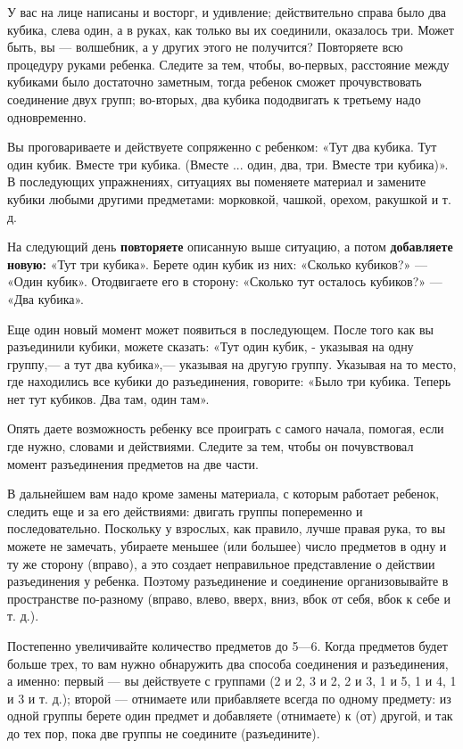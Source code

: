\documentclass[a5paper]{book}
\begin{document}
У вас на лице написаны и восторг, и удивление; действительно справа было
два кубика, слева один, а в руках, как только вы их соединили, оказалось
три. Может быть, вы --- волшебник, а у других этого не получится?
Повторяете всю процедуру руками ребенка. Следите за тем, чтобы,
во-первых, расстояние между кубиками было достаточно заметным, тогда
ребенок сможет прочувствовать соединение двух групп; во-вторых, два
кубика пододвигать к третьему надо одновременно.

Вы проговариваете и действуете сопряженно с ребенком: «Тут два кубика.
Тут один кубик. Вместе три кубика. (Вместе ... один, два, три. Вместе
три кубика)». В последующих упражнениях, ситуациях вы поменяете материал
и замените кубики любыми другими предметами: морковкой, чашкой, орехом,
ракушкой и т. д.

На следующий день \textbf{повторяете} описанную выше ситуацию, а потом
\textbf{добавляете новую:} «Тут три кубика». Берете один кубик из них:
«Сколько кубиков?» --- «Один кубик». Отодвигаете его в сторону: «Сколько
тут осталось кубиков?» --- «Два кубика».

Еще один новый момент может появиться в последующем. После того как вы
разъединили кубики, можете сказать: «Тут один кубик, - указывая на одну
группу,--- а тут два кубика»,--- указывая на другую группу. Указывая на
то место, где находились все кубики до разъединения, говорите: «Было три
кубика. Теперь нет тут кубиков. Два там, один там».

Опять даете возможность ребенку все проиграть с самого начала, помогая,
если где нужно, словами и действиями. Следите за тем, чтобы он
почувствовал момент разъединения предметов на две части.

В дальнейшем вам надо кроме замены материала, с которым работает
ребенок, следить еще и за его действиями: двигать группы попеременно и
последовательно. Поскольку у взрослых, как правило, лучше правая рука,
то вы можете не замечать, убираете меньшее (или большее) число предметов
в одну и ту же сторону (вправо), а это создает неправильное
представление о действии разъединения у ребенка. Поэтому разъединение и
соединение организовывайте в пространстве по-разному (вправо, влево,
вверх, вниз, вбок от себя, вбок к себе и т. д.).

Постепенно увеличивайте количество предметов до 5---6. Когда предметов
будет больше трех, то вам нужно обнаружить два способа соединения и
разъединения, а именно: первый --- вы действуете с группами (2 и 2, 3 и
2, 2 и 3, 1 и 5, 1 и 4, 1 и 3 и т. д.); второй --- отнимаете или
прибавляете всегда по одному предмету: из одной группы берете один
предмет и добавляете (отнимаете) к (от) другой, и так до тех пор, пока
две группы не соедините (разъедините).
\end{document}
